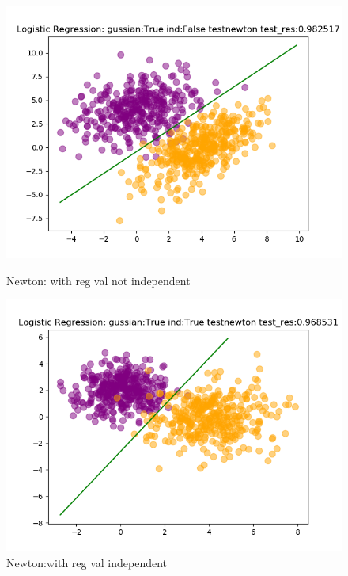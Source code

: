 \documentclass{article}
\begin{document}
\begin{figure}[h]
    \begin{minipage}[t]{0.4\linewidth}
    \centering
    \includegraphics[width=1.2\textwidth]{pic/LogisticRegression_gussian=Trueind=Falsetestnewton.png}
    \caption{Newton: with reg val not independent}
    \label{fig:Newton: with reg val not independent}
    \end{minipage}
    \hfill
    \begin{minipage}[t]{0.4\linewidth}%
    \centering
    \includegraphics[width=1.2\textwidth]{pic/LogisticRegression_gussian=Trueind=Truetestnewton.png}
    \caption{Newton:with reg val independent}
    \label{fig:Newton:with reg val independent}
    \end{minipage}
\end{figure}
\end{document}
